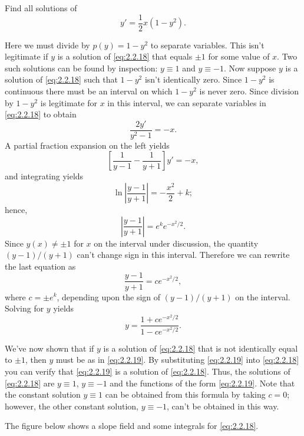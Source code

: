 \documentclass{ximera}
\begin{document}
\begin{example}\label{example:2.2.5}
Find all solutions of
\begin{equation} \label{eq:2.2.18}
y'=\frac{1}{2}x(1-y^2).
\end{equation}
 
\begin{explanation}
 
Here we must divide by $p(y)=1-y^2$ to separate variables.
This isn't  legitimate if $y$ is a solution of \eqref{eq:2.2.18} that
equals $\pm 1$ for some value of $x$. Two such solutions can be found
by inspection: $y \equiv 1$ and $y\equiv -1$. Now suppose
$y$ is a solution of \eqref{eq:2.2.18} such that $1-y^2$ isn't
identically zero. Since $1-y^2$ is continuous there must be an
interval on which $1-y^2$ is never zero. Since division by $1-y^2$ is
legitimate for $x$ in this interval, we can separate variables in
\eqref{eq:2.2.18} to obtain
$$
\frac{2y'}{y^2-1}=-x.
$$
 A partial fraction expansion on the left yields
$$
\left[\frac{1}{y-1}-\frac{1}{y+1}\right]y'=-x,
$$
and integrating  yields
$$
\ln\left|\frac{y-1}{y+1}\right|=-\frac{x^2}{2}+k;
$$
 hence,
$$
\left|\frac{y-1}{y+1}\right|=e^ke^{-x^2/2}.
$$
 Since $y(x)\neq \pm 1$ for $x$ on the interval under discussion, the
quantity
$(y-1)/(y+1)$  can't  change sign in this interval. Therefore
we can rewrite the last equation as
$$
\frac{y-1}{y+1}=ce^{-x^2/2},
$$
  where $c=\pm e^k$, depending upon the sign of $(y-1)/(y+1)$ on the
interval.
 Solving for  $y$ yields
\begin{equation} \label{eq:2.2.19}
y=\frac{1+ce^{-x^2/2}}{1-ce^{-x^2/2}}.
\end{equation}
 
We've now shown that if $y$ is a solution of \eqref{eq:2.2.18} that  is
not identically equal to $\pm 1$, then $y$ must be as in
\eqref{eq:2.2.19}. By substituting \eqref{eq:2.2.19} into \eqref{eq:2.2.18} you
 can verify that \eqref{eq:2.2.19} is  a solution of
\eqref{eq:2.2.18}. Thus,  the solutions of \eqref{eq:2.2.18}
are $y\equiv 1$, $y\equiv -1$ and the functions of the form
\eqref{eq:2.2.19}. Note that the constant solution $y \equiv 1$ can be
obtained from this formula by taking $c=0$;     however, the other
constant solution, $y \equiv -1$, can't be obtained in this way.
 
The figure below shows a slope field and some integrals for
\eqref{eq:2.2.18}.
 
 

\begin{center}
\end{center}
\end{explanation}
\end{example}
 
\end{document}
